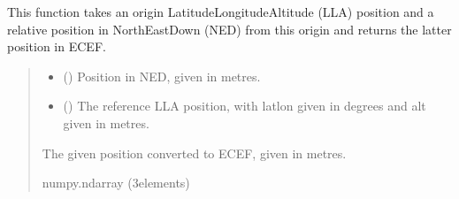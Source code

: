 \documentclass[letterpaper,10pt,english]{sphinxmanual}
\begin{document}
\begin{fulllineitems}
\label{\detokenize{modules/util/transformations:qnav.util.transformations.ned2ecef}}
\pysigstartsignatures
{}
\pysigstopsignatures
\sphinxAtStartPar
This function takes an origin Latitude\sphinxhyphen{}Longitude\sphinxhyphen{}Altitude (LLA) position
and a relative position in North\sphinxhyphen{}East\sphinxhyphen{}Down (NED) from this origin and
returns the latter position in ECEF.
\begin{quote}\begin{description}
\begin{itemize}
\item {} 
\sphinxAtStartPar
{} (\sphinxstyleliteralemphasis{\sphinxupquote{ (}}\sphinxstyleliteralemphasis{\sphinxupquote{)}}) \textendash{} Position in NED, given in metres.

\item {} 
\sphinxAtStartPar
{} (\sphinxstyleliteralemphasis{\sphinxupquote{ (}}\sphinxstyleliteralemphasis{\sphinxupquote{)}}) \textendash{} The reference LLA position, with lat\sphinxhyphen{}lon given in degrees
and alt given in metres.

\end{itemize}

\sphinxAtStartPar
The given position converted to ECEF, given in metres.

\sphinxAtStartPar
numpy.ndarray (3\sphinxhyphen{}elements)

\end{description}\end{quote}

\end{fulllineitems}

\end{document}
